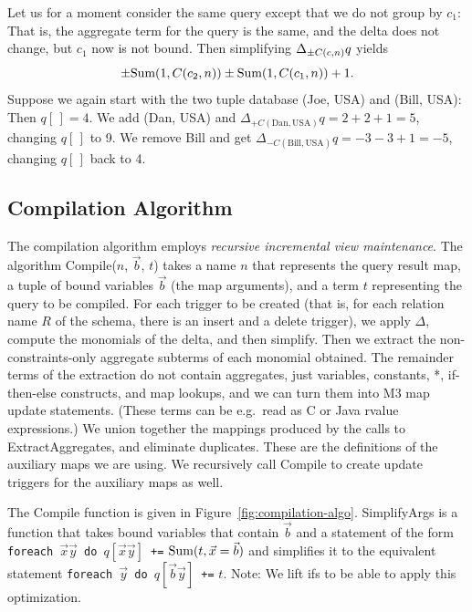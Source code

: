 \begin{example}
Let us for a moment consider the same query except that we do not group by
$c_1$: That is, the aggregate term for the query is the same, and the delta does not change, but $c_1$ now is not bound. Then simplifying $\Delta_{\pm C(c,n)} q$ yields
\[
\pm \mbox{Sum}(1, C(c_2, n)) \pm \mbox{Sum}(1, C(c_1,n)) + 1.
\]
Suppose we again start with the two tuple database (Joe, USA) and (Bill, USA):
Then $q[\,] = 4$. We add (Dan, USA) and
$\Delta_{+C(\mathrm{Dan}, \mathrm{USA})} q = 2 + 2 + 1 = 5$, changing
$q[\,]$ to 9. We remove Bill and get
$\Delta_{-C(\mathrm{Bill}, \mathrm{USA})} q = -3 - 3 + 1 = -5$, changing
$q[\,]$ back to 4.
\punto
\end{example}




\subsection{Compilation Algorithm}
\label{sec:compilation-alg}




The compilation algorithm employs {\em recursive incremental view
maintenance}. The algorithm Compile($n$, $\vec{b}$, $t$) takes a name $n$ that
represents the query result map, a tuple of bound variables $\vec{b}$ (the map
arguments), and a term $t$ representing the query to be compiled.
For each trigger to be created (that is, for each relation name $R$ of
the schema, there is an insert and a delete trigger),
we apply $\Delta$, compute the monomials of the delta, and then simplify.
Then we extract the non-constraints-only aggregate
subterms of each monomial obtained.
The remainder terms of the extraction
do not contain aggregates, just variables, constants, *,
if-then-else constructs, and map lookups, and we can turn them into
M3 map update statements. (These terms can be e.g.\ read as C or Java rvalue
expressions.)
%
We union together the mappings produced by the calls to ExtractAggregates,
and eliminate duplicates. 
These are the definitions of the auxiliary maps we are using.
We recursively call Compile to create update triggers for the
auxiliary maps as well.


The Compile function is given in Figure~\ref{fig:compilation-algo}. 
SimplifyArgs is a function that takes bound variables that contain
$\vec{b}$ and a statement of the form
{\tt foreach $\vec{x}\vec{y}$ do $q[\vec{x}\vec{y}]$ +=}
$\mbox{Sum}(t, \vec{x}=\vec{b})$
and simplifies it to the equivalent statement
{\tt foreach $\vec{y}$ do $q[\vec{b}\vec{y}]$ +=} $t$.
Note: We lift ifs to be able to apply this optimization.



